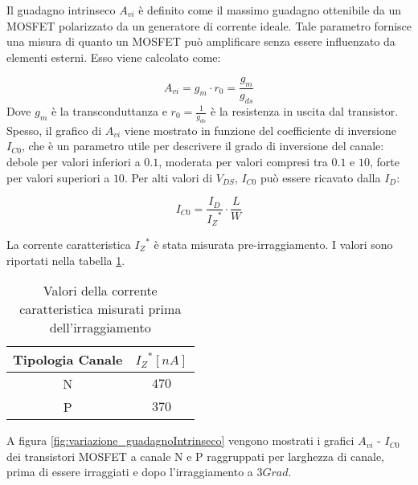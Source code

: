 Il guadagno intrinseco $A_{vi}$ è definito come il massimo guadagno ottenibile da un MOSFET polarizzato da un generatore di corrente ideale.
Tale parametro fornisce una misura di quanto un MOSFET può amplificare senza essere influenzato da elementi esterni.
Esso viene calcolato come:

\begin{equation}
    A_{vi} = g_{m} \cdot r_0 = \frac{g_{m}}{g_{ds}}
\end{equation}
Dove  $g_m$ è la transconduttanza e $r_0 = \frac{1}{g_{ds}}$ è la resistenza in uscita dal transistor. Spesso, il grafico di $A_{vi}$ viene mostrato in funzione del coefficiente di inversione $I_{C0}$, che è un parametro utile per descrivere il grado di inversione del canale: debole per valori inferiori a $0.1$, moderata per valori compresi tra $0.1$ e $10$, forte per valori superiori a $10$. Per alti valori di $V_{DS}$, $I_{C0}$ può essere ricavato dalla $I_D$:

\begin{equation}
    I_{C0} = \frac{I_{D}}{{I_{Z}}^{*}} \cdot \frac{L}{W}
\end{equation}

La corrente caratteristica ${I_{Z}}^{*}$ è stata misurata pre-irraggiamento. I valori sono riportati nella tabella \ref{tab:corrente_caratteristica}.

\begin{table}[ht]
    \centering
    \begin{tabular}{c c}
        \toprule
        Tipologia Canale & ${I_{Z}}^{*}[nA]$ \\
        \midrule
        N                & $470$     \\
        P                & $370$     \\
        \bottomrule
    \end{tabular}
    \caption[Valori estratti $I_z^*$]{Valori della corrente caratteristica misurati prima dell'irraggiamento}
    \label{tab:corrente_caratteristica}
\end{table}


A figura \ref{fig:variazione_guadagnoIntrinseco} vengono mostrati i grafici $A_{vi}$ - $I_{C0}$ dei transistori MOSFET a canale N e P raggruppati per larghezza di canale, prima di essere irraggiati e dopo l'irraggiamento a $3Grad$.


